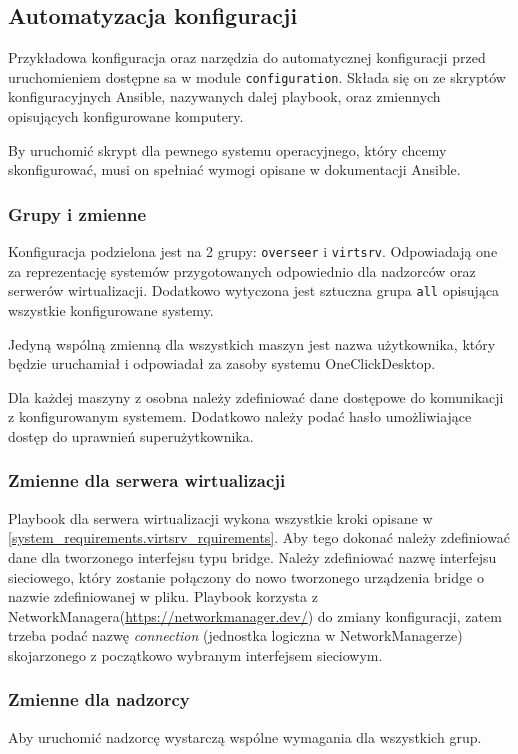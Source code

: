 \documentclass[../opis-rozwiazania.tex]{subfiles}
\begin{document}
\subsection{Automatyzacja konfiguracji}
\label{system_requirements.ansible_conf}
Przykładowa konfiguracja oraz narzędzia do automatycznej konfiguracji przed uruchomieniem dostępne sa w module \texttt{configuration}\parencite{ocd-configuration}.
Składa się on ze skryptów konfiguracyjnych Ansible, nazywanych dalej playbook, oraz zmiennych opisujących konfigurowane komputery.

By uruchomić skrypt dla pewnego systemu operacyjnego, który chcemy skonfigurować, musi on spełniać wymogi opisane w dokumentacji Ansible\parencite{ansible-connection}.

\subsubsection{Grupy i zmienne}
Konfiguracja podzielona jest na 2 grupy: \texttt{overseer} i \texttt{virtsrv}.
Odpowiadają one za reprezentację systemów przygotowanych odpowiednio dla nadzorców oraz serwerów wirtualizacji.
Dodatkowo wytyczona jest sztuczna grupa \texttt{all} opisująca wszystkie konfigurowane systemy.

Jedyną wspólną zmienną dla wszystkich maszyn jest nazwa użytkownika, który będzie uruchamiał i odpowiadał za zasoby systemu OneClickDesktop.

Dla każdej maszyny z osobna należy zdefiniować dane dostępowe do komunikacji z konfigurowanym systemem. Dodatkowo należy podać hasło umożliwiające dostęp do uprawnień superużytkownika.

\subsubsection{Zmienne dla serwera wirtualizacji}
Playbook dla serwera wirtualizacji wykona wszystkie kroki opisane w \ref{system_requirements.virtsrv_rquirements}.
Aby tego dokonać należy zdefiniować dane dla tworzonego interfejsu typu bridge.
Należy zdefiniować nazwę interfejsu sieciowego, który zostanie połączony do nowo tworzonego urządzenia bridge o nazwie zdefiniowanej w pliku.
Playbook korzysta z NetworkManagera(\url{https://networkmanager.dev/}) do zmiany konfiguracji, zatem trzeba podać nazwę \textit{connection} (jednostka logiczna w NetworkManagerze) skojarzonego z początkowo wybranym interfejsem sieciowym.

\subsubsection{Zmienne dla nadzorcy}
Aby uruchomić nadzorcę wystarczą wspólne wymagania dla wszystkich grup.
\end{document}
